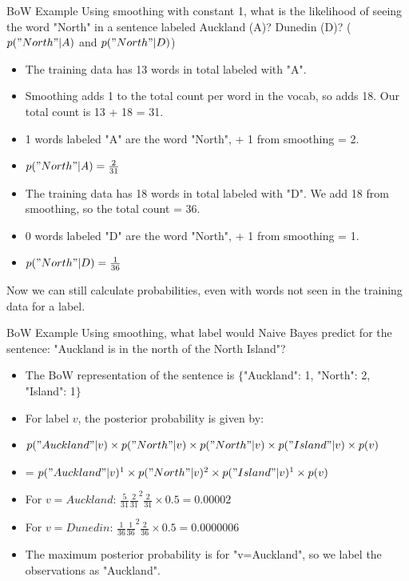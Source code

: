 \documentclass[aspectratio=169, 10pt]{beamer}
\begin{document}
\begin{frame}{BoW Example}
 Using smoothing with constant 1, what is the likelihood of seeing the word "North" in a sentence labeled Auckland (A)? Dunedin (D)? ($p("North"|A)$ and $p("North"|D)$)
 \pause
 \begin{itemize}
     \item The training data has 13 words in total labeled with "A".
     \item Smoothing adds 1 to the total count per word in the vocab, so adds 18. Our total count is 13 + 18 = 31.
     \item 1 words labeled "A" are the word "North", + 1 from smoothing = 2.
     \item $p("North"|A) = \frac{2}{31}$
     \pause
     \item The training data has 18 words in total labeled with "D". We add 18 from smoothing, so the total count = 36.
     \item 0 words labeled "D" are the word "North", + 1 from smoothing = 1.
     \item $p("North"|D) = \frac{1}{36}$
 \end{itemize}
 Now we can still calculate probabilities, even with words not seen in the training data for a label.
\end{frame}

\begin{frame}{BoW Example}
    Using smoothing, what label would Naive Bayes predict for the sentence: "Auckland is in the north of the North Island"?
    \pause
    \begin{itemize}
        \item The BoW representation of the sentence is $\{$"Auckland": 1, "North": 2, "Island": 1$\}$
        \item For label $v$, the posterior probability is given by:
        \item $p("Auckland"|v)\times p("North"|v) \times p("North"|v) \times p("Island"|v) \times p(v)$
        \item = $p("Auckland"|v)^1\times p("North"|v)^2 \times p("Island"|v)^1 \times p(v)$
        \pause
        \item For $v=Auckland$: $\frac{5}{31}\frac{2}{31}^2\frac{2}{31}\times 0.5 = 0.00002$
        \item For $v=Dunedin$: $\frac{1}{36}\frac{1}{36}^2\frac{2}{36}\times 0.5 = 0.0000006$
        \item The maximum posterior probability is for "v=Auckland", so we label the observations as "Auckland".
    \end{itemize}
\end{frame}
\end{document}
